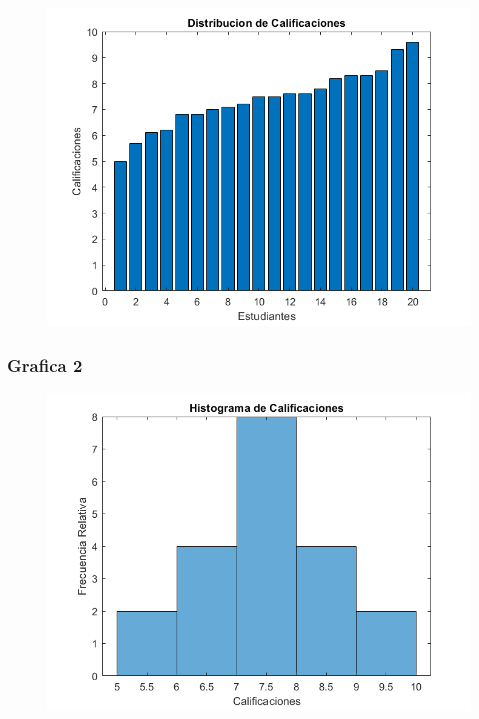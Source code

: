 \documentclass{article}
\begin{document}
	\begin{figure}[h]
		\centering
		\includegraphics[width=\textwidth]{grafica19a.png}
	\end{figure}
	
	\newpage
	
	\subsubsection{Grafica 2}
	
	\begin{figure}[h]
		\centering
		\includegraphics[width=\textwidth]{grafica19b.png}
	\end{figure}
	
	\newpage
	
\end{document}
